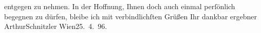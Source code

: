               entgegen zu nehmen.\pend
           \pstart {\pb}In der Hoffnung, Ihnen doch auch einmal
               perſönlich begegnen zu dürfen, bleibe ich mit verbindlichſten Grüßen Ihr dankbar
               ergebner \spacefill\mbox{ArthurSchnitzler}\pend{}
\pstart
           Wien25. 4. 96.\pend
           \endnumbering{}  \newcommand{\dateiname}{L00542}\newcommand{\titel}{Arthur Schnitzler an Georg Brandes, 25. 4. 1896}\newcommand{\editorInnen}{Martin Anton Müller und Gerd-Hermann Susen}

